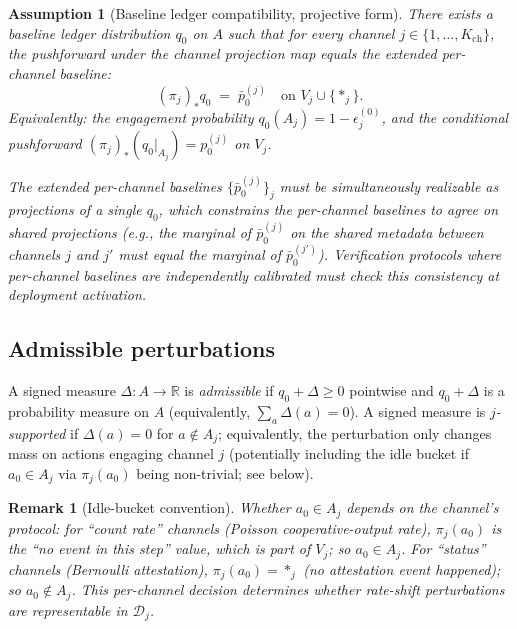 \documentclass{article}
\newtheorem{remark}{Remark}
\newtheorem{assumption}{Assumption}
\newcommand{\Kch}{K_{\mathrm{ch}}}
\begin{document}
\begin{assumption}[Baseline ledger compatibility, projective form]
\label{ass:baseline-compat-v3}
There exists a baseline ledger distribution $q_0$ on $A$ such that
for every channel $j \in \{1, \ldots, \Kch\}$, the pushforward
under the channel projection map equals the extended per-channel
baseline:
\begin{equation}
\label{eq:projective-baseline}
  (\pi_j)_* q_0 \;=\; \bar{p}_0^{(j)} \quad\text{on } V_j \cup \{*_j\}.
\end{equation}
Equivalently: the engagement probability $q_0(A_j) = 1 -
\epsilon_j^{(0)}$, and the conditional pushforward
$(\pi_j)_*(q_0|_{A_j}) = p_0^{(j)}$ on $V_j$.

The extended per-channel baselines $\{\bar{p}_0^{(j)}\}_j$ must be
\emph{simultaneously realizable} as projections of a single $q_0$,
which constrains the per-channel baselines to agree on shared
projections (e.g., the marginal of $\bar{p}_0^{(j)}$ on the
shared metadata between channels $j$ and $j'$ must equal the
marginal of $\bar{p}_0^{(j')}$).  Verification protocols where
per-channel baselines are independently calibrated must check this
consistency at deployment activation.
\end{assumption}

\subsection{Admissible perturbations}

A signed measure $\Delta: A \to \mathbb{R}$ is \emph{admissible} if
$q_0 + \Delta \geq 0$ pointwise and $q_0 + \Delta$ is a probability
measure on $A$ (equivalently, $\sum_a \Delta(a) = 0$).  A signed
measure is \emph{$j$-supported} if $\Delta(a) = 0$ for $a \notin
A_j$; equivalently, the perturbation only changes mass on actions
engaging channel $j$ (potentially including the idle bucket if
$a_0 \in A_j$ via $\pi_j(a_0)$ being non-trivial; see below).

\begin{remark}[Idle-bucket convention]
\label{rem:idle}
Whether $a_0 \in A_j$ depends on the channel's protocol: for
``count rate'' channels (Poisson cooperative-output rate),
$\pi_j(a_0)$ is the ``no event in this step'' value, which is part
of $V_j$; so $a_0 \in A_j$.  For ``status'' channels (Bernoulli
attestation), $\pi_j(a_0) = *_j$ (no attestation event happened);
so $a_0 \notin A_j$.  This per-channel decision determines whether
rate-shift perturbations are representable in $\mathcal{D}_j$.
\end{remark}
\end{document}
